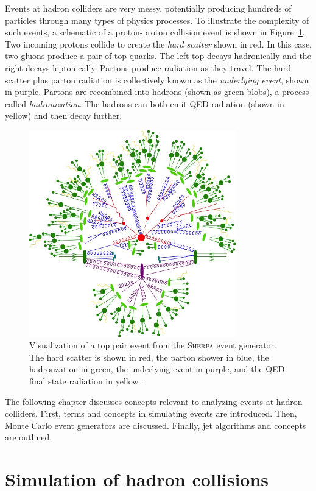 Events at hadron colliders are very messy, potentially producing hundreds of particles through many types of physics processes. To illustrate the complexity of such events, a schematic of a proton-proton collision event is shown in Figure~\ref{fig:event}. Two incoming protons collide to create the \emph{hard scatter} shown in red. In this case, two gluons produce a pair of top quarks. The left top decays hadronically and the right decays leptonically. Partons produce radiation as they travel. The hard scatter plus parton radiation is collectively known as the \emph{underlying event}, shown in purple.  Partons are recombined into hadrons (shown as green blobs), a process called \emph{hadronization}. The hadrons can both emit QED radiation (shown in yellow) and then decay further.
\begin{figure}
\centering
\includegraphics[width=0.8\textwidth]{fig/thry/qcdevent}
\caption{Visualization of a top pair event from the \textsc{Sherpa} event generator. The hard scatter is shown in red, the parton shower in blue, the hadronzation in green, the underlying event in purple, and the QED final state radiation in yellow~\cite{sherpaevent}.}
\label{fig:event}
\end{figure}
The following chapter discusses concepts relevant to analyzing events at hadron colliders. First, terms and concepts in simulating events are introduced. Then, Monte Carlo event generators are discussed. Finally, jet algorithms and concepts are outlined.
\section{Simulation of hadron collisions}

